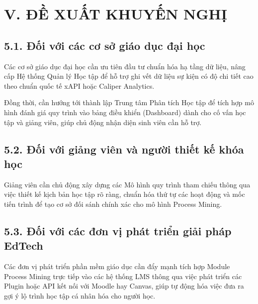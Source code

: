 \section{V. ĐỀ XUẤT KHUYẾN NGHỊ}

\subsection{5.1. Đối với các cơ sở giáo dục đại học}
Các cơ sở giáo dục đại học cần ưu tiên đầu tư chuẩn hóa hạ tầng dữ liệu, nâng cấp Hệ thống Quản lý Học tập để hỗ trợ ghi vết dữ liệu sự kiện có độ chi tiết cao theo chuẩn quốc tế xAPI hoặc Caliper Analytics.

Đồng thời, cần hướng tới thành lập Trung tâm Phân tích Học tập để tích hợp mô hình đánh giá quy trình vào bảng điều khiển (Dashboard) dành cho cố vấn học tập và giảng viên, giúp chủ động nhận diện sinh viên cần hỗ trợ.

\subsection{5.2. Đối với giảng viên và người thiết kế khóa học}
Giảng viên cần chủ động xây dựng các Mô hình quy trình tham chiếu thông qua việc thiết kế kịch bản học tập rõ ràng, chuẩn hóa thứ tự các hoạt động và mốc tiến trình để tạo cơ sở đối sánh chính xác cho mô hình Process Mining.

\subsection{5.3. Đối với các đơn vị phát triển giải pháp EdTech}
Các đơn vị phát triển phần mềm giáo dục cần đẩy mạnh tích hợp Module Process Mining trực tiếp vào các hệ thống LMS thông qua việc phát triển các Plugin hoặc API kết nối với Moodle hay Canvas, giúp tự động hóa việc đưa ra gợi ý lộ trình học tập cá nhân hóa cho người học.
